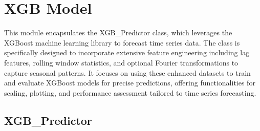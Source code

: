 \documentclass[letterpaper,10pt,english]{sphinxmanual}
\begin{document}
\sphinxstepscope


\section{XGB Model}
\label{\detokenize{docs/XGB_model:xgb-model}}\label{\detokenize{docs/XGB_model::doc}}
\sphinxAtStartPar
This module encapsulates the XGB\_Predictor class, which leverages the XGBoost machine learning library to forecast
time series data.
The class is specifically designed to incorporate extensive
feature engineering including lag features, rolling window statistics, and optional Fourier transformations to capture
seasonal patterns. It focuses on using these enhanced datasets to train and evaluate
XGBoost models for precise predictions, offering functionalities for scaling, plotting, and performance assessment
tailored to time series forecasting.


\subsection{XGB\_Predictor}
\label{\detokenize{docs/XGB_model:xgb-predictor}}
\end{document}
